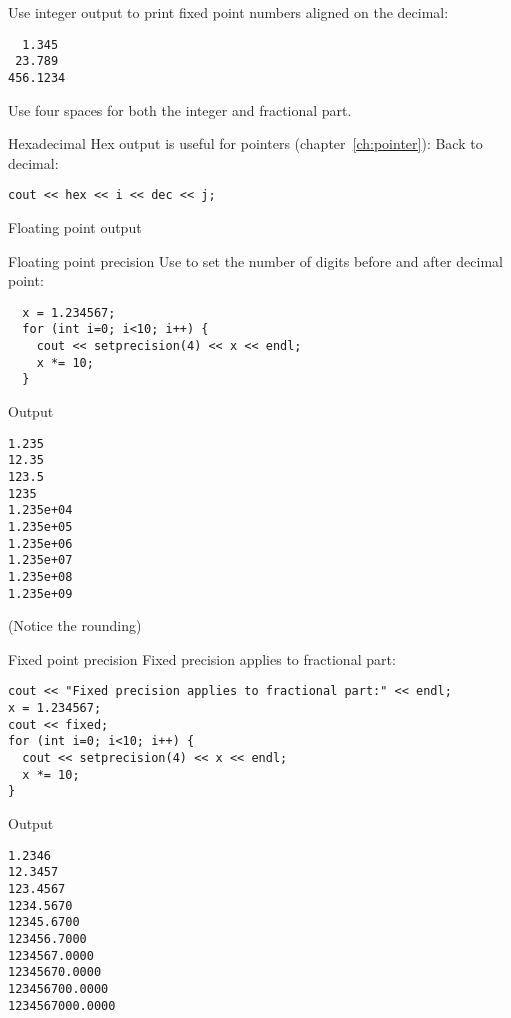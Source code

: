 
\begin{exercise}
  \label{ex:fixedpout}
  Use integer output to print fixed point numbers aligned on the
  decimal:
\begin{verbatim}
  1.345
 23.789
456.1234
\end{verbatim}
  Use four spaces for both the integer and fractional part.
\end{exercise}

\begin{block}{Hexadecimal}
  \label{sl:io-hex}
  Hex output is useful for pointers (chapter~\ref{ch:pointer}):
  Back to decimal:
\begin{verbatim}
cout << hex << i << dec << j;
\end{verbatim}
\end{block}

 {Floating point output}

\begin{block}{Floating point precision}
  \label{sl:io-float}
  Use  to set the number of digits before and after
  decimal point:
\begin{verbatim}
  x = 1.234567;
  for (int i=0; i<10; i++) {
    cout << setprecision(4) << x << endl;
    x *= 10;
  }
\end{verbatim}
\end{block}

\begin{block}{Output}
  \label{sl:io-float-out}
\begin{verbatim}
1.235
12.35
123.5
1235
1.235e+04
1.235e+05
1.235e+06
1.235e+07
1.235e+08
1.235e+09
\end{verbatim}
(Notice the rounding)
\end{block}

\begin{block}{Fixed point precision}
  \label{sl:io-fix}
  Fixed precision applies to fractional part:
\begin{verbatim}
cout << "Fixed precision applies to fractional part:" << endl;
x = 1.234567;
cout << fixed;
for (int i=0; i<10; i++) {
  cout << setprecision(4) << x << endl;
  x *= 10;
}
\end{verbatim}
\end{block}

\begin{block}{Output}
  \label{sl:io-fix-out}
\begin{verbatim}
1.2346
12.3457
123.4567
1234.5670
12345.6700
123456.7000
1234567.0000
12345670.0000
123456700.0000
1234567000.0000
\end{verbatim}
\end{block}

